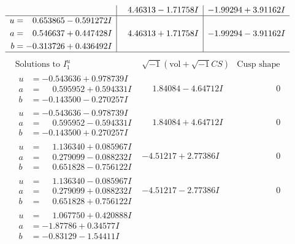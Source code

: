 \documentclass[1p]{elsarticle_modified}
\theoremstyle{definition}
\newcommand{\I}{\sqrt{-1}}
\begin{document}
$$\begin{array}{c|c|c}
 & \phantom{-}4.46313 - 1.71758 I & -1.99294 + 3.91162 I \\ \hline\begin{aligned}
u &= \phantom{-}0.653865 - 0.591272 I \\
a &= \phantom{-}0.546637 + 0.447428 I \\
b &= -0.313726 + 0.436492 I\end{aligned}
 & \phantom{-}4.46313 + 1.71758 I & -1.99294 - 3.91162 I\\
 \hline 
 \end{array}$$\newpage$$\begin{array}{c|c|c}  
\text{Solutions to }I^u_{1}& \I (\text{vol} + \sqrt{-1}CS) & \text{Cusp shape}\\
 \hline 
\begin{aligned}
u &= -0.543636 + 0.978739 I \\
a &= \phantom{-}0.595952 + 0.594331 I \\
b &= -0.143500 - 0.270257 I\end{aligned}
 & \phantom{-}1.84084 - 4.64712 I & \phantom{-0.000000 } 0 \\ \hline\begin{aligned}
u &= -0.543636 - 0.978739 I \\
a &= \phantom{-}0.595952 - 0.594331 I \\
b &= -0.143500 + 0.270257 I\end{aligned}
 & \phantom{-}1.84084 + 4.64712 I & \phantom{-0.000000 } 0 \\ \hline\begin{aligned}
u &= \phantom{-}1.136340 + 0.085967 I \\
a &= \phantom{-}0.279099 - 0.088232 I \\
b &= \phantom{-}0.651828 - 0.756122 I\end{aligned}
 & -4.51217 + 2.77386 I & \phantom{-0.000000 } 0 \\ \hline\begin{aligned}
u &= \phantom{-}1.136340 - 0.085967 I \\
a &= \phantom{-}0.279099 + 0.088232 I \\
b &= \phantom{-}0.651828 + 0.756122 I\end{aligned}
 & -4.51217 - 2.77386 I & \phantom{-0.000000 } 0 \\ \hline\begin{aligned}
u &= \phantom{-}1.067750 + 0.420888 I \\
a &= -1.87786 + 0.34577 I \\
b &= -0.83129 - 1.54411 I\end{aligned}

\end{array}$$
\end{document}
